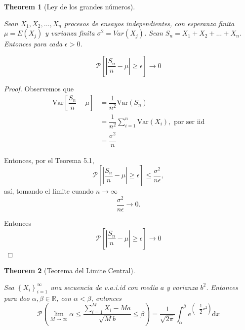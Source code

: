 \documentclass[
  letterpaper,
  DIV=11,
  numbers=noendperiod]{scrreprt}
\theoremstyle{definition}
\theoremstyle{plain}
\newtheorem{theorem}{Theorem}[chapter]
\theoremstyle{remark}
\begin{document}
\begin{theorem}[Ley de los grandes
números]\protect\hypertarget{thm-5.2}{}\label{thm-5.2}

Sean \(X_{1},X_{2},\dots, X_{n}\) procesos de ensayos independientes,
con esperanza finita \(\mu=E(X_{j})\) y varianza finita
\(\sigma^{2}=Var(X_{j})\). Sean \(S_{n}=X_{1}+X_{2}+\ldots+X_{n}\).
Entonces para cada \(\epsilon>0\).

\[
\mathcal{P}\left[\left|\dfrac{S_{n}}{n}-\mu\right|\geq\epsilon\right]\to0
\]

\end{theorem}

\begin{proof}

Observemos que \begin{align*}
\text{Var}\left[\dfrac{S_{n}}{n}-\mu\right] & =\dfrac{1}{n^{2}}\text{Var}\left(S_{n}\right)\\
& =\dfrac{1}{n^{2}}\sum_{i=1}^{n}\text{Var}\left(X_{i}\right),\text{ por ser iid}\\
& =\dfrac{\sigma^{2}}{n}
\end{align*}

Entonces, por el Teorema 5.1, \[
\mathcal{P}\left[\left|\dfrac{S_{n}}{n}-\mu\right|\geq\epsilon\right]\leq\dfrac{\sigma^{2}}{n\epsilon},
\] así, tomando el limite cuando \(n\to\infty\) \[
\dfrac{\sigma^{2}}{n\epsilon}\to0.
\]

Entonces \[
\mathcal{P}\left[\left|\dfrac{S_{n}}{n}-\mu\right|\geq\epsilon\right]\to0
\]

\end{proof}

\begin{theorem}[Teorema del Limite
Central]\protect\hypertarget{thm-5.3}{}\label{thm-5.3}

Sea \(\left\{ X_{i}\right\} _{i=1}^{\infty}\) una secuencia de v.a.i.id
con media \(a\) y varianza \(b^{2}\). Entonces para doo
\(\alpha,\beta\in\mathbb{R}\), con \(\alpha<\beta\), entonces \[
\mathcal{P}\left(\lim_{M\to\infty}\alpha\le\dfrac{{\displaystyle \sum_{i=1}^{M}}X_{i}-Ma}{\sqrt{M}b}\leq\beta\right)=\dfrac{1}{\sqrt{2\pi}}\int_{\alpha}^{\beta}e^{\left(-\dfrac{1}{2}x^{2}\right)}\mathrm{d}x
\]

\end{theorem}
\end{document}
